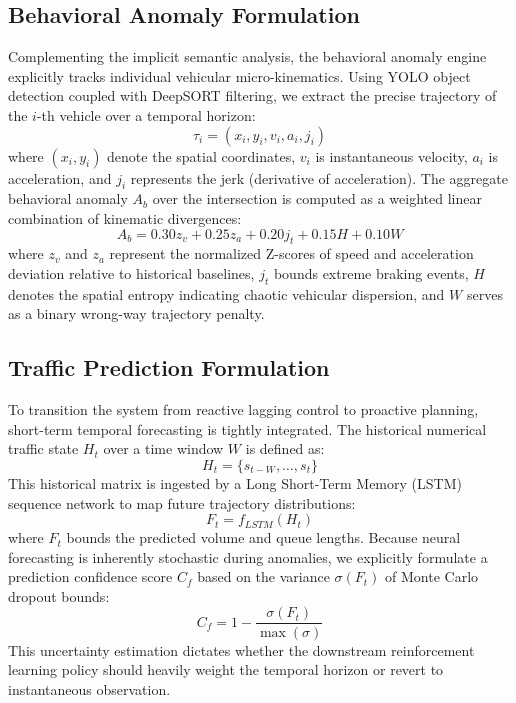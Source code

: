\subsection{Behavioral Anomaly Formulation}
Complementing the implicit semantic analysis, the behavioral anomaly engine explicitly tracks individual vehicular micro-kinematics. Using YOLO object detection coupled with DeepSORT filtering, we extract the precise trajectory of the $i$-th vehicle over a temporal horizon:
\begin{equation}
\tau_i = (x_i, y_i, v_i, a_i, j_i)
\end{equation}
where $(x_i, y_i)$ denote the spatial coordinates, $v_i$ is instantaneous velocity, $a_i$ is acceleration, and $j_i$ represents the jerk (derivative of acceleration). The aggregate behavioral anomaly $A_b$ over the intersection is computed as a weighted linear combination of kinematic divergences:
\begin{equation}
A_b = 0.30z_v + 0.25z_a + 0.20j_t + 0.15H + 0.10W
\end{equation}
where $z_v$ and $z_a$ represent the normalized Z-scores of speed and acceleration deviation relative to historical baselines, $j_t$ bounds extreme braking events, $H$ denotes the spatial entropy indicating chaotic vehicular dispersion, and $W$ serves as a binary wrong-way trajectory penalty.

\subsection{Traffic Prediction Formulation}
To transition the system from reactive lagging control to proactive planning, short-term temporal forecasting is tightly integrated. The historical numerical traffic state $H_t$ over a time window $W$ is defined as:
\begin{equation}
H_t = \{s_{t-W}, \dots, s_t\}
\end{equation}
This historical matrix is ingested by a Long Short-Term Memory (LSTM) sequence network to map future trajectory distributions:
\begin{equation}
F_t = f_{LSTM}(H_t)
\end{equation}
where $F_t$ bounds the predicted volume and queue lengths. Because neural forecasting is inherently stochastic during anomalies, we explicitly formulate a prediction confidence score $C_f$ based on the variance $\sigma(F_t)$ of Monte Carlo dropout bounds:
\begin{equation}
C_f = 1 - \frac{\sigma(F_t)}{\max(\sigma)}
\end{equation}
This uncertainty estimation dictates whether the downstream reinforcement learning policy should heavily weight the temporal horizon or revert to instantaneous observation.

